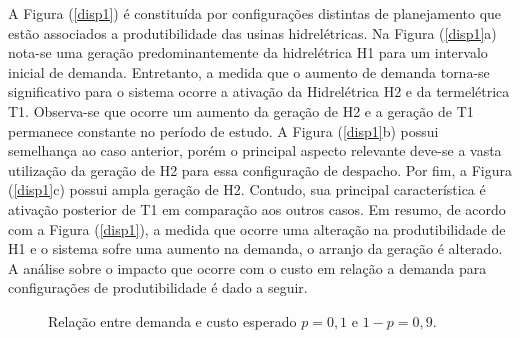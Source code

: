 \documentclass[12pt,fleqn]{article}
\begin{document}
A Figura (\ref{disp1}) \'e constitu\'ida por configura\c c\~oes distintas de planejamento que est\~ao associados a produtibilidade das usinas hidrel\'etricas. Na Figura (\ref{disp1}a) nota-se uma gera\c c\~ao predominantemente da hidrel\'etrica H1 para um intervalo inicial de demanda. Entretanto, a medida que o aumento de demanda torna-se significativo para o sistema ocorre a ativa\c c\~ao da Hidrel\'etrica H2 e da termel\'etrica T1. Observa-se que ocorre um aumento da gera\c c\~ao de H2 e a gera\c c\~ao de T1 permanece constante no per\'iodo de estudo. A Figura (\ref {disp1}b) possui semelhan\c ca ao caso anterior, por\'em  o principal aspecto relevante deve-se a vasta utiliza\c c\~ao da gera\c c\~ao de H2 para essa configura\c c\~ao de despacho. Por fim, a Figura (\ref{disp1}c) possui ampla gera\c c\~ao de H2. Contudo, sua principal caracter\'istica \'e ativa\c c\~ao posterior de T1 em compara\c c\~ao aos outros casos. Em resumo, de acordo com a Figura (\ref{disp1}), a medida que ocorre uma altera\c c\~ao na produtibilidade de H1 e o sistema sofre uma aumento na demanda, o arranjo da gera\c c\~ao \'e alterado.  A an\'alise sobre o impacto que ocorre com o custo em rela\c c\~ao a demanda para configura\c c\~oes de produtibilidade \'e dado a seguir. 
\begin{figure}[!htpb]
\centering
	\caption{Relação entre demanda e custo esperado $p = 0,1$ e $1-p = 0,9$.}
	\label{cust1}
\end{figure}
\end{document}
